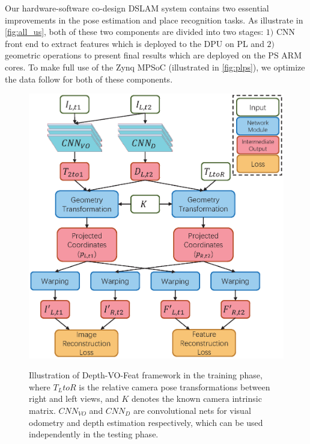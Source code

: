 \label{sec:hardsoft}
Our hardware-software co-design DSLAM system contains two essential improvements in the pose estimation and place recognition tasks. As illustrate in \cref{fig:all_us}, both of these two components are divided into two stages: $1)$ CNN front end to extract features which is deployed to the DPU on PL and $2)$ geometric operations to present final results which are deployed on the PS ARM cores. To make full use of the Zynq MPSoC (illustrated in \cref{fig:plps}), we optimize the data follow for both of these components.

\begin{figure}[t]  
    \centering  
    {\includegraphics[width=0.85\linewidth]{fig/depth_vo_feat.eps}\label{fig:dvo}}
    \caption{Illustration of Depth-VO-Feat framework in the training phase, where $T_LtoR$ is the relative camera pose transformations between right and left views, and $K$ denotes the known camera intrinsic matrix. $CNN_{VO}$ and $CNN_D$ are convolutional nets for visual odometry and depth estimation respectively, which can be used independently in the testing phase. }
\end{figure}

